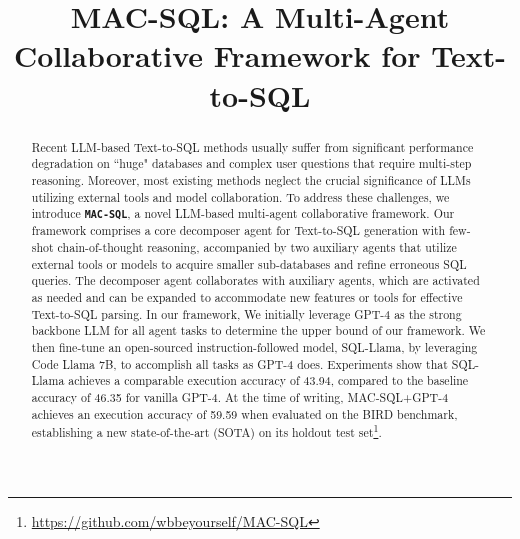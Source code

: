 \title{MAC-SQL: A Multi-Agent Collaborative Framework for Text-to-SQL}



\maketitle
\newcommand{\eat}[1]{}




\newcommand{\inserthl}[1]{\sethlcolor{promptinsert}\hl{#1}}
\newcommand{\codehl}[1]{\sethlcolor{codehlcolor}\hl{#1}}
\newcommand{\codehlerr}[1]{\sethlcolor{codehlcolor2}\hl{#1}}

\begin{abstract}
Recent LLM-based Text-to-SQL methods usually suffer from significant performance degradation on ``huge" databases and complex user questions that require multi-step reasoning. Moreover, most existing methods neglect the crucial significance of LLMs utilizing external tools and model collaboration. To address these challenges, we introduce \textbf{\texttt{MAC-SQL}}, a novel LLM-based multi-agent collaborative framework. Our framework comprises a core decomposer agent for Text-to-SQL generation with few-shot chain-of-thought reasoning, accompanied by two auxiliary agents that utilize external tools or models to acquire smaller sub-databases and refine erroneous SQL queries. The decomposer agent collaborates with auxiliary agents, which are activated as needed and can be expanded to accommodate new features or tools for effective Text-to-SQL parsing. In our framework, We initially leverage GPT-4 as the strong backbone LLM for all agent tasks to determine the upper bound of our framework. We then fine-tune an open-sourced instruction-followed model, SQL-Llama, by leveraging Code Llama 7B, to accomplish all tasks as GPT-4 does. Experiments show that SQL-Llama achieves a comparable execution accuracy of 43.94, compared to the baseline accuracy of 46.35 for vanilla GPT-4. At the time of writing, MAC-SQL+GPT-4 achieves an execution accuracy of 59.59 when evaluated on the BIRD benchmark, establishing a new state-of-the-art (SOTA) on its holdout test set\footnote{\url{https://github.com/wbbeyourself/MAC-SQL}}.

\end{abstract}

